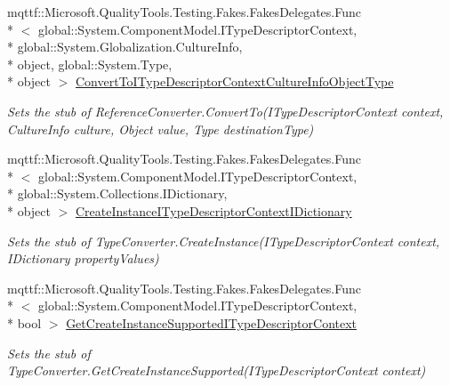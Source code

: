 \begin{DoxyCompactItemize}
mqttf\-::\-Microsoft.\-Quality\-Tools.\-Testing.\-Fakes.\-Fakes\-Delegates.\-Func\\*
$<$ global\-::\-System.\-Component\-Model.\-I\-Type\-Descriptor\-Context, \\*
global\-::\-System.\-Globalization.\-Culture\-Info, \\*
object, global\-::\-System.\-Type, \\*
object $>$ \hyperlink{class_system_1_1_component_model_1_1_fakes_1_1_stub_component_converter_ae0655af312b0b7d0d8d744f84c0ad83b}{Convert\-To\-I\-Type\-Descriptor\-Context\-Culture\-Info\-Object\-Type}
\begin{DoxyCompactList}\small\item\em Sets the stub of Reference\-Converter.\-Convert\-To(\-I\-Type\-Descriptor\-Context context, Culture\-Info culture, Object value, Type destination\-Type)\end{DoxyCompactList}\item 
mqttf\-::\-Microsoft.\-Quality\-Tools.\-Testing.\-Fakes.\-Fakes\-Delegates.\-Func\\*
$<$ global\-::\-System.\-Component\-Model.\-I\-Type\-Descriptor\-Context, \\*
global\-::\-System.\-Collections.\-I\-Dictionary, \\*
object $>$ \hyperlink{class_system_1_1_component_model_1_1_fakes_1_1_stub_component_converter_a267ad55c0dd62cd8a7b62ee942cf9e5b}{Create\-Instance\-I\-Type\-Descriptor\-Context\-I\-Dictionary}
\begin{DoxyCompactList}\small\item\em Sets the stub of Type\-Converter.\-Create\-Instance(\-I\-Type\-Descriptor\-Context context, I\-Dictionary property\-Values)\end{DoxyCompactList}\item 
mqttf\-::\-Microsoft.\-Quality\-Tools.\-Testing.\-Fakes.\-Fakes\-Delegates.\-Func\\*
$<$ global\-::\-System.\-Component\-Model.\-I\-Type\-Descriptor\-Context, \\*
bool $>$ \hyperlink{class_system_1_1_component_model_1_1_fakes_1_1_stub_component_converter_a1c120239cad7da26588b9476923fecfe}{Get\-Create\-Instance\-Supported\-I\-Type\-Descriptor\-Context}
\begin{DoxyCompactList}\small\item\em Sets the stub of Type\-Converter.\-Get\-Create\-Instance\-Supported(\-I\-Type\-Descriptor\-Context context)\end{DoxyCompactList}\item 

\end{DoxyCompactItemize}
